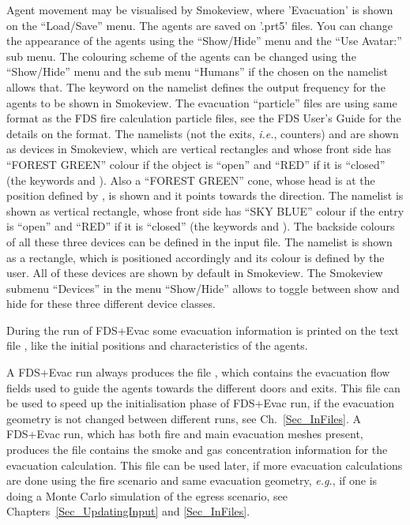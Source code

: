 \documentclass[12pt,a4paper,final,twoside]{stylevk}
\begin{document}
Agent movement may be visualised by Smokeview, where 'Evacuation' is
shown on the ``Load/Save'' menu.  The agents are saved on '.prt5'
files.  You can change the appearance of the agents using the
``Show/Hide'' menu and the ``Use Avatar:'' sub menu.  The colouring
scheme of the agents can be changed using the ``Show/Hide'' menu and
the sub menu ``Humans'' if the chosen  on the
 namelist allows that.  The  keyword on
the  namelist defines the output frequency for the agents
to be shown in Smokeview.  The evacuation ``particle'' files are using
same format as the FDS fire calculation particle files, see the FDS
User's Guide for the details on the format.  The namelists
 (not the  exits, \emph{i.e.},
counters) and  are shown as devices in Smokeview, which
are vertical rectangles and whose front side has ``FOREST GREEN''
colour if the object is ``open'' and ``RED'' if it is ``closed'' (the
keywords  and ).  Also a ``FOREST
GREEN'' cone, whose head is at the position defined by , is
shown and it points towards the  direction.  The namelist
 is shown as vertical rectangle, whose front side has
``SKY BLUE'' colour if the entry is ``open'' and ``RED'' if it is
``closed'' (the keywords  and ).
The backside colours of all these three devices can be defined in the
input file.  The  namelist is shown as a rectangle, which
is positioned accordingly and its colour is defined by the user.  All
of these devices are shown by default in Smokeview.  The Smokeview
submenu ``Devices'' in the menu ``Show/Hide'' allows to toggle between
show and hide for these three different device classes.


During the run of FDS+Evac some evacuation information is printed on
the text file , like the initial positions and
characteristics of the agents.


A FDS+Evac run always produces the file , which
contains the evacuation flow fields used to guide the agents towards
the different doors and exits.  This file can be used to speed up the
initialisation phase of FDS+Evac run, if the evacuation geometry is
not changed between different runs, see Ch.~\ref{Sec_InFiles}.  A
FDS+Evac run, which has both fire and main evacuation meshes present,
produces the file  contains the smoke and gas
concentration information for the evacuation calculation.  This file
can be used later, if more evacuation calculations are done using the
fire scenario and same evacuation geometry, \emph{e.g.}, if one is
doing a Monte Carlo simulation of the egress scenario, see
Chapters~\ref{Sec_UpdatingInput} and \ref{Sec_InFiles}.
\end{document}
